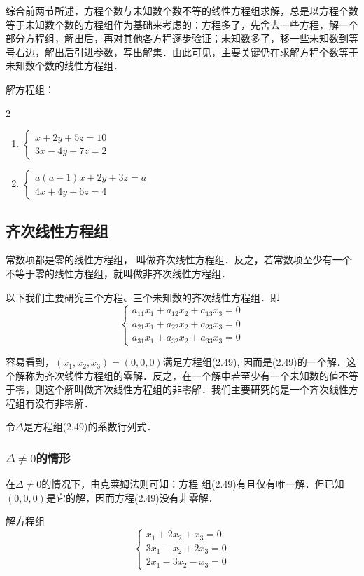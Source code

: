 综合前两节所述，方程个数与未知数个数不等的线性方程组求解，总是以方程个数等于未知数个数的方程组作为基础来考虑的：方程多了，先舍去一些方程，解一个部分方程组，解出后，再对其他各方程逐步验证；未知数多了，移一些未知数到等号右边，解出后引进参数，写出解集．由此可见，主要关键仍在求解方程个数等于未知数个数的线性方程组．

\begin{ex}
解方程组：
\begin{multicols}{2}
 \begin{enumerate}
    \item $\begin{cases}
        x+2y+5z=10\\3x-4y+7z=2
    \end{cases}$
    \item $\begin{cases}
        a(a-1)x+2y+3z=a\\ 4x+4y+6z=4
    \end{cases}$
\end{enumerate}   
\end{multicols}
\end{ex}

\subsection{齐次线性方程组}
常数项都是零的线性方程组，
叫做齐次线性方程组．反之，若常数项至少有一个不等于零的线性方程组，就叫做非齐次线性方程组．

以下我们主要研究三个方程、三个未知数的齐次线性方程组．即
\begin{equation}
    \begin{cases}
a_{11}x_1+a_{12}x_2+a_{13}x_3=0\\
a_{21}x_1+a_{22}x_2+a_{23}x_3=0\\
a_{31}x_1+a_{32}x_2+a_{33}x_3=0
    \end{cases}
\end{equation}

容易看到，$(x_1,x_2,x_3)=(0, 0, 0)$满足方程组(2.49), 因而是(2.49)的一个解．这个解称为齐次线性方程组的零解．反之，在一个解中若至少有一个未知数的值不等于零，则这个解叫做齐次线性方程组的非零解．我们主要研究的是一个齐次线性方程组有没有非零解．

令$\Delta$是方程组(2.49)的系数行列式．

\subsubsection{$\Delta\ne 0$的情形}
在$\Delta\ne 0$的情况下，由克莱姆法则可知：方程
组(2.49)有且仅有唯一解．但已知$(0, 0, 0)$是它的解，因而方程(2.49)没有非零解．
\begin{example}
解方程组 \[\begin{cases}
    x_1+2x_2+x_3=0\\
3x_1-x_2+2x_3=0\\
2x_1-3x_2-x_3=0
\end{cases}\]
\end{example}

